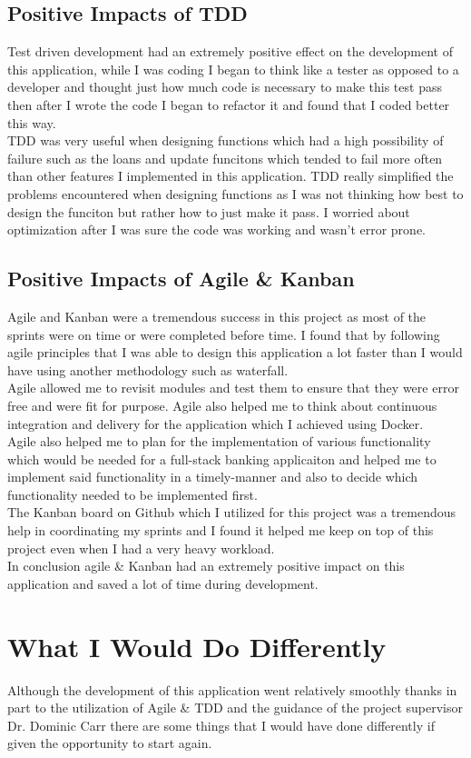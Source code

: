 \subsection{Positive Impacts of TDD}
Test driven development had an extremely positive effect on the development of this application, while I was coding I began to think like a tester as opposed to a developer and thought just how much code is necessary to make this test pass then after I wrote the code I began to refactor it and found that I coded better this way.
\\
TDD was very useful when designing functions which had a high possibility of failure such as the loans and update funcitons which tended to fail more often than other features I implemented in this application.  TDD really simplified the problems encountered when designing functions as I was not thinking how best to design the funciton but rather how to just make it pass.  I worried about optimization after I was sure the code was working and wasn't error prone.
\subsection{Positive Impacts of Agile \& Kanban}
Agile and Kanban were a tremendous success in this project as most of the sprints were on time or were completed before time.  I found that by following agile principles that I was able to design this application a lot faster than I would have using another methodology such as waterfall.
\\
Agile allowed me to revisit modules and test them to ensure that they were error free and were fit for purpose.  Agile also helped me to think about continuous integration and delivery for the application which I achieved using Docker.
\\
Agile also helped me to plan for the implementation of various functionality which would be needed for a full-stack banking applicaiton and helped me to implement said functionality in a timely-manner and also to decide which functionality needed to be implemented first.
\\
The Kanban board on Github which I utilized for this project was a tremendous help in coordinating my sprints and I found it helped me keep on top of this project even when I had a very heavy workload.
\\
In conclusion agile \& Kanban had an extremely positive impact on this application and saved a lot of time during development.
\section{What I Would Do Differently}
Although the development of this application went relatively smoothly thanks in part to the utilization of Agile \& TDD and the guidance of the project supervisor Dr. Dominic Carr there are some things that I would have done differently if given the opportunity to start again.
